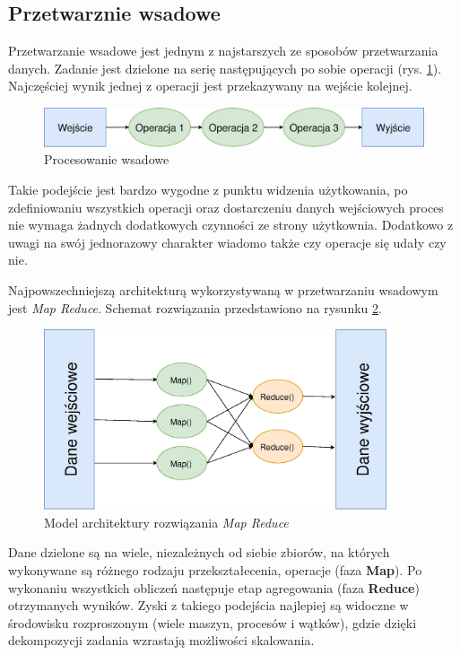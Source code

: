 \subsection{Przetwarznie wsadowe}
Przetwarzanie wsadowe jest jednym z najstarszych ze sposobów przetwarzania danych.
Zadanie jest dzielone na serię następujących po sobie operacji (rys. \ref{fig:BatchProcessing}).
Najczęściej wynik jednej z operacji jest przekazywany na wejście kolejnej.

\begin{figure}[htbp]
\centering
	\includegraphics[width=1\textwidth]{img/batch}
	\caption{Procesowanie wsadowe}
  \label{fig:BatchProcessing}
\end{figure}
Takie podejście jest bardzo wygodne z punktu widzenia użytkowania,
po zdefiniowaniu wszystkich operacji oraz dostarczeniu danych wejściowych
proces nie wymaga żadnych dodatkowych czynności ze strony użytkownia.
Dodatkowo z uwagi na swój jednorazowy charakter wiadomo także czy operacje się udały czy nie.

Najpowszechniejszą architekturą wykorzystywaną w przetwarzaniu wsadowym jest \textit{Map Reduce}.
Schemat rozwiązania przedstawiono na rysunku \ref{fig:MapReduce}.
\begin{figure}[htbp]
\centering
	\includegraphics[width=0.9\textwidth]{img/mr}
	\caption{Model architektury rozwiązania \textit{Map Reduce}}
  \label{fig:MapReduce}
\end{figure}
Dane dzielone są na wiele,
niezależnych od siebie zbiorów,
na których wykonywane są różnego rodzaju przekształecenia,
operacje (faza \textbf{Map}).
Po wykonaniu wszystkich obliczeń następuje etap agregowania (faza \textbf{Reduce}) otrzymanych wyników.
Zyski z takiego podejścia najlepiej są widoczne w środowisku rozproszonym (wiele maszyn, procesów i wątków),
gdzie dzięki dekompozycji zadania wzrastają możliwości skalowania.

